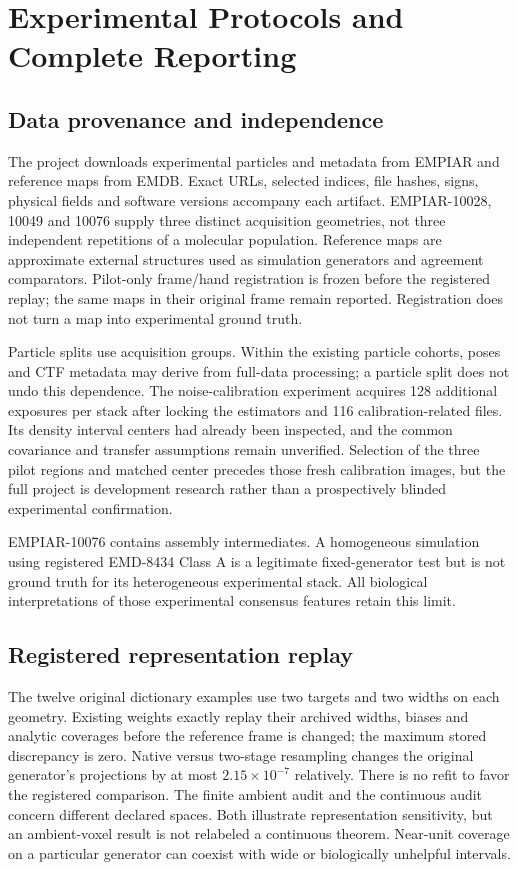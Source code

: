 \section{Experimental Protocols and Complete Reporting}\label{app:experiments}
\subsection{Data provenance and independence}
The project downloads experimental particles and metadata from EMPIAR and
reference maps from EMDB. Exact URLs, selected indices, file hashes, signs,
physical fields and software versions accompany each artifact. EMPIAR-10028,
10049 and 10076 supply three distinct acquisition geometries, not three
independent repetitions of a molecular population. Reference maps are
approximate external structures used as simulation generators and agreement
comparators. Pilot-only frame/hand registration is frozen before the
registered replay; the same maps in their original frame remain reported.
Registration does not turn a map into experimental ground truth.

Particle splits use acquisition groups. Within the existing particle
cohorts, poses and CTF metadata may derive from full-data processing; a
particle split does not undo this dependence. The noise-calibration
experiment acquires 128 additional exposures per stack after locking the
estimators and 116 calibration-related files. Its density interval centers
had already been inspected, and the common covariance and transfer
assumptions remain unverified. Selection of the three pilot regions and
matched center precedes those fresh calibration images, but the full
project is development research rather than a prospectively blinded
experimental confirmation.

EMPIAR-10076 contains assembly intermediates. A homogeneous simulation
using registered EMD-8434 Class A is a legitimate fixed-generator test but
is not ground truth for its heterogeneous experimental stack. All biological
interpretations of those experimental consensus features retain this limit.

\subsection{Registered representation replay}
The twelve original dictionary examples use two targets and two widths on
each geometry. Existing weights exactly replay their archived widths, biases
and analytic coverages before the reference frame is changed; the maximum
stored discrepancy is zero. Native versus two-stage resampling changes the
original generator's projections by at most $2.15\times10^{-7}$ relatively.
There is no refit to favor the registered comparison.
The finite ambient audit and the continuous audit concern different declared
spaces. Both illustrate representation sensitivity, but an ambient-voxel
result is not relabeled a continuous theorem. Near-unit coverage on a
particular generator can coexist with wide or biologically unhelpful intervals.

